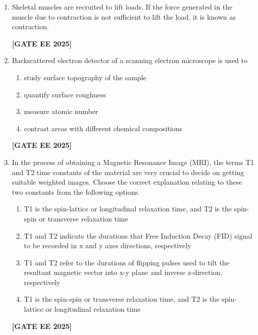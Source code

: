 \documentclass[journal]{IEEEtran}
\newcommand{\qfooter}{%
  \begin{flushright}\footnotesize\textbf{[GATE EE 2025]}\end{flushright}\vspace{1em}%
}
\begin{document}
\begin{enumerate}
\item Skeletal muscles are recruited to lift loads. If the force generated in the muscle due to contraction is not sufficient to lift the load, it is known as \underline{\hspace{2cm}} contraction.

\begin{enumerate}
\end{enumerate}
\qfooter

\item Backscattered electron detector of a scanning electron microscope is used to

\begin{enumerate}
\item study surface topography of the sample
\item quantify surface roughness
\item measure atomic number
\item contrast areas with different chemical compositions
\end{enumerate}
\qfooter

\item In the process of obtaining a Magnetic Resonance Image (MRI), the terms T1 and T2 time constants of the material are very crucial to decide on getting suitable weighted images. Choose the correct explanation relating to these two constants from the following options.

\begin{enumerate}
\item T1 is the spin-lattice or longitudinal relaxation time, and T2 is the spin-spin or transverse relaxation time
\item T1 and T2 indicate the durations that Free Induction Decay (FID) signal to be recorded in x and y axes directions, respectively
\item T1 and T2 refer to the durations of flipping pulses used to tilt the resultant magnetic vector into x-y plane and inverse z-direction, respectively
\item T1 is the spin-spin or transverse relaxation time, and T2 is the spin-lattice or longitudinal relaxation time
\end{enumerate}
\qfooter


\end{enumerate}
\end{document}
